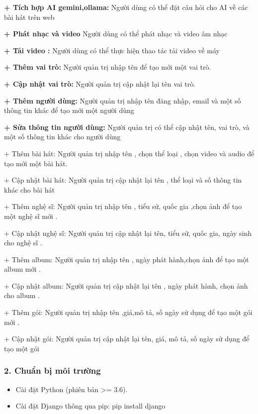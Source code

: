 \documentclass{article}
\begin{document}
\textbf{+ Tích hợp AI gemini,ollama:} Người dùng có thể đặt câu hỏi cho
AI về các bài hát trên web

\textbf{+ Phát nhạc và video} Người dùng có thể phát nhạc và video âm
nhạc

\textbf{+ Tải video :} Người dùng có thể thực hiện thao tác tải video về
máy

\textbf{+ Thêm vai trò:} Người quản trị nhập tên để tạo mới một vai trò.

\textbf{+ Cập nhật vai trò:} Người quản trị cập nhật lại tên vai trò.

\textbf{+ Thêm người dùng:} Người quản trị nhập tên đăng nhập, email và
một số thông tin khác để tạo mới một người dùng

\textbf{+ Sửa thông tin người dùng:} Người quản trị có thể cập nhật tên,
vai trò, và một số thông tin khác cho người dùng

+ Thêm bài hát: Người quản trị nhập tên , chọn thể loại , chọn video và
audio để tạo mới một bài hát.

+ Cập nhật bài hát: Người quản trị cập nhật lại tên , thể loại và số
thông tin khác cho bài hát

+ Thêm nghệ sĩ: Người quản trị nhập tên , tiểu sử, quốc gia ,chọn ảnh để
tạo một nghệ sĩ mới .

+ Cập nhật nghệ sĩ: Người quản trị cập nhật lại tên, tiểu sử, quốc gia,
ngày sinh cho nghệ sĩ .

+ Thêm album: Người quản trị nhập tên , ngày phát hành,chọn ảnh để tạo
một album mới .

+ Cập nhật album: Người quản trị cập nhật lại tên , ngày phát hành, chọn
ảnh cho album .

+ Thêm gói: Người quản trị nhập tên ,giá,mô tả, số ngày sử dụng để tạo
một gói mới .

+ Cập nhật gói: Người quản trị cập nhật lại tên, giá, mô tả, số ngày sử
dụng để tạo một gói

\subsubsection{\texorpdfstring{\textbf{2. Chuẩn bị môi
trường}}{2. Chuẩn bị môi trường}}\label{chuux1ea9n-bux1ecb-muxf4i-trux1b0ux1eddng}

\begin{itemize}
\item
  Cài đặt Python (phiên bản \textgreater= 3.6).
\item
  Cài đặt Django thông qua pip: pip install django
\end{itemize}
\end{document}
